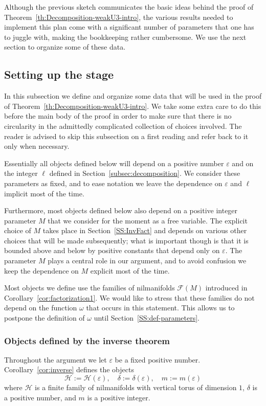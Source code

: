 \documentclass[11pt]{amsart}
\theoremstyle{definition}
\begin{document}
 Although the previous sketch communicates the basic ideas behind the proof of Theorem~\ref{th:Decomposition-weakU3-intro},
the various results needed to implement this plan come with a significant number
 of parameters that one has to juggle with,
  making the bookkeeping  rather cumbersome.
We use the next section to organize some of these data.
\subsection{Setting up the stage}
\label{subsec:beginning} In this subsection we  define and organize
some data  that will be used in the proof of
Theorem~\ref{th:Decomposition-weakU3-intro}. We take some extra care
to do this before the main body of the proof in order to make sure
that there is no circularity in the admittedly complicated
collection of
 choices involved.
 The
reader is advised to skip this  subsection on a first reading and
refer back to it only when necessary.

Essentially all objects defined below will depend on a positive
number ${\varepsilon}$ and   on the  integer $\ell$ defined in
Section~\ref{subsec:decomposition}. We consider  these parameters as
fixed, and to ease notation we leave the dependence on ${\varepsilon}$ and
$\ell$  implicit most of the time.

Furthermore,  most  objects defined below also depend  on a positive
 integer parameter $M$ that we consider for the moment as a free variable.
 The explicit choice of $M$ takes place in Section~\ref{SS:InvFact} and depends on various other choices
  that will be made subsequently;
what is important though is that it is
 bounded above and below by positive constants that depend only
on ${\varepsilon}$.
 The parameter $M$ plays a central role in our argument, and to avoid confusion
 we keep the dependence on $M$ explicit
 most of the time.

Most  objects we define use the families of  nilmanifolds ${{\mathcal F}}(M)$
introduced in  Corollary~\ref{cor:factorization1}. We would like to
stress that these families do not depend on the function $\omega$
that occurs  in this statement. This allows us to postpone the
definition of $\omega$ until Section~\ref{SS:def-parameters}.

\subsubsection{Objects defined by the inverse theorem}
Throughout the argument we let ${\varepsilon}$ be a fixed positive number.
 Corollary~\ref{cor:inverse} defines the objects
  $$
  {{\mathcal H}}:={{\mathcal H}}({\varepsilon}), \quad \delta:=\delta({\varepsilon}), \quad m:=m({\varepsilon})
  $$
where ${{\mathcal H}}$ is a finite family   of nilmanifolds with vertical torus
of dimension $1$, $\delta$ is a positive number, and $m$ is a
positive integer.
  
\end{document}
